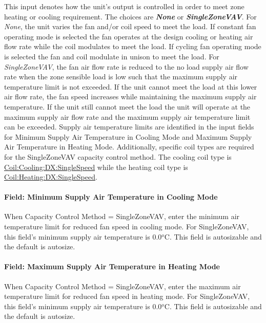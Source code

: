 This input denotes how the unit's output is controlled in order to meet zone heating or cooling requirement. The choices are \textbf{\emph{None}} or \textbf{\emph{SingleZoneVAV}}. For \emph{None}, the unit varies the fan and/or coil speed to meet the load. If constant fan operating mode is selected the fan operates at the design cooling or heating air flow rate while the coil modulates to meet the load. If cycling fan operating mode is selected the fan and coil modulate in unison to meet the load. For \emph{SingleZoneVAV}, the fan air flow rate is reduced to the no load supply air flow rate when the zone sensible load is low such that the maximum supply air temperature limit is not exceeded. If the unit cannot meet the load at this lower air flow rate, the fan speed increases while maintaining the maximum supply air temperature. If the unit still cannot meet the load the unit will operate at the maximum supply air flow rate and the maximum supply air temperature limit can be exceeded. Supply air temperature limits are identified in the input fields for Minimum Supply Air Temperature in Cooling Mode and Maximum Supply Air Temperature in Heating Mode. Additionally, specific coil types are required for the SingleZoneVAV capacity control method. The cooling coil type is \hyperref[coilcoolingdxsinglespeed]{Coil:Cooling:DX:SingleSpeed} while the heating coil type is \hyperref[coilheatingdxsinglespeed]{Coil:Heating:DX:SingleSpeed}.

\paragraph{Field: Minimum Supply Air Temperature in Cooling Mode}\label{field-minimum-supply-air-temperature-in-cooling-mode-3}

When Capacity Control Method = SingleZoneVAV, enter the minimum air temperature limit for reduced fan speed in cooling mode. For SingleZoneVAV, this field's minimum supply air temperature is 0.0\(^{o}\)\si{C}. This field is autosizable and the default is autosize.

\paragraph{Field: Maximum Supply Air Temperature in Heating Mode}\label{field-maximum-supply-air-temperature-in-heating-mode-3}

When Capacity Control Method = SingleZoneVAV, enter the maximum air temperature limit for reduced fan speed in heating mode. For SingleZoneVAV, this field's minimum supply air temperature is 0.0\(^{o}\)\si{C}. This field is autosizable and the default is autosize.


